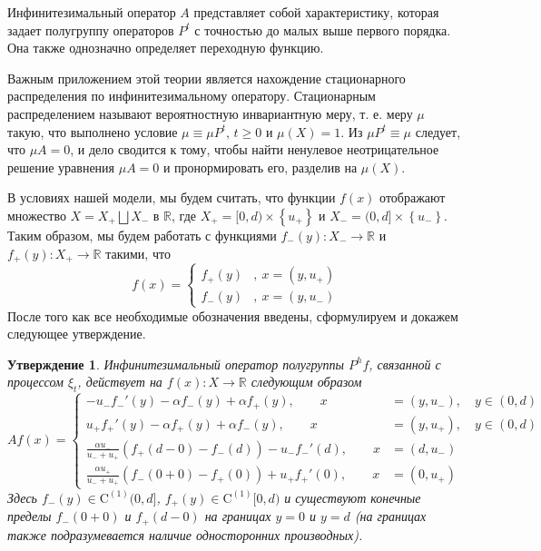 \documentclass[12pt,a4paper]{article}
\newtheorem{utv}{Утверждение}
\begin{document}
Инфинитезимальный оператор $A$ представляет собой характеристику, которая задает полугруппу операторов $P^t$ с точностью до малых выше первого порядка. Она также однозначно определяет переходную функцию.


Важным приложением этой теории является нахождение стационарного распределения по инфинитезимальному оператору. Стационарным распределением называют вероятностную инвариантную меру, т. е. меру $\mu$ такую, что выполнено условие $\mu \equiv \mu P^t, \, t \geq 0$ и $\mu (X) = 1$. 
Из $\mu P^t \equiv \mu$ следует, что $\mu A = 0$, и дело сводится к тому, чтобы найти ненулевое неотрицательное решение уравнения $\mu A = 0$ и пронормировать его, разделив на $\mu (X)$.

В условиях нашей модели, мы будем считать, что функции $f ( x )$ отображают множество $X = X_+ \bigsqcup X_-$ в $\mathbb{R}$, где $X_+ = [0, d) \times \left\{u_+\right\}$ и $X_- = (0, d] \times \left\{u_-\right\}$. Таким образом, мы будем работать с функциями $f_- (y): X_- \to \mathbb{R}$ и $f_+ (y): X_+ \to \mathbb{R}$ такими, что
$$
f(x) = \left\{ \begin{array}{cl}
f_+ ( y ) & , \ x = \left( y, u_+ \right) \\
f_- ( y ) & , \ x = \left( y, u_- \right) 
\end{array} \right.
$$
После того как все необходимые обозначения введены, сформулируем и докажем следующее утверждение.
\begin{utv}
Инфинитезимальный оператор полугруппы $P^h f$, связанной с процессом $\xi_t$, действует на $f(x): X \to \mathbb{R}$ следующим образом
\begin{equation}
A f(x) =
\left\{ \begin{aligned} 
  -u_- f_-' (y) - \alpha f_- (y) + \alpha f_+ (y), \qquad x &= (y, u_-),  \quad  y \in (0, d)\\
  u_+ f_+' (y) - \alpha f_+ (y) + \alpha f_- (y), \qquad  x &= (y, u_+),  \quad  y \in (0, d)\\
  \frac{\alpha u_-}{u_- + u_+} (f_+ (d -  0) - f_- (d)) - u_- f_-' (d), \qquad  x &= (d, u_-)\\
  \frac{\alpha u_+}{u_- + u_+} (f_- (0 + 0) - f_+ (0)) + u_+ f_+' (0), \qquad  x &= (0, u_+)
\end{aligned} \right.
\end{equation}
 Здесь $f_- (y) \in \mathrm{C}^{(1)} (0, d]$, $f_+ (y) \in \mathrm{C}^{(1)} [0, d)$ и существуют конечные пределы $f_- (0 + 0)$ и $f_+ (d -  0)$ на границах $y = 0$ и $y = d$ (на границах также подразумевается наличие односторонних производных).
\end{utv}
\end{document}
